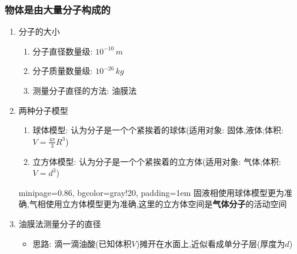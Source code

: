 \documentclass{article}
\begin{document}
\subsubsection{物体是由大量分子构成的}
\begin{enumerate}
    \item 分子的大小
          \begin{enumerate}[label = (\arabic*{})]
              \item 分子直径数量级: $10^{-10} \, m$
              \item 分子质量数量级: $10^{-26} \, kg$
              \item 测量分子直径的方法: 油膜法
          \end{enumerate}

    \item 两种分子模型
          \begin{enumerate}[label = (\arabic*{})]
              \item 球体模型: 认为分子是一个个紧挨着的球体(适用对象: 固体,液体;体积:$V = \frac{4\pi}{3} R^{3}$)
              \item 立方体模型: 认为分子是一个个紧挨着的立方体(适用对象: 气体;体积:$V = d^{3}$)
          \end{enumerate}

          \vspace{-1em}
          \hspace{1em}\begin{adjustbox}{minipage=0.86\linewidth, bgcolor=gray!20, padding=1em}
              \small
              固液相使用球体模型更为准确,气相使用立方体模型更为准确,这里的立方体空间是\textbf{气体分子}的活动空间
          \end{adjustbox}
          \vspace{-1em}

          \vspace{2em}

    \item 油膜法测量分子的直径
          \begin{itemize}
              \item 思路: 滴一滴油酸(已知体积$V$)摊开在水面上,近似看成单分子层(厚度为$d$)


\end{itemize}
\end{enumerate}
\end{document}
